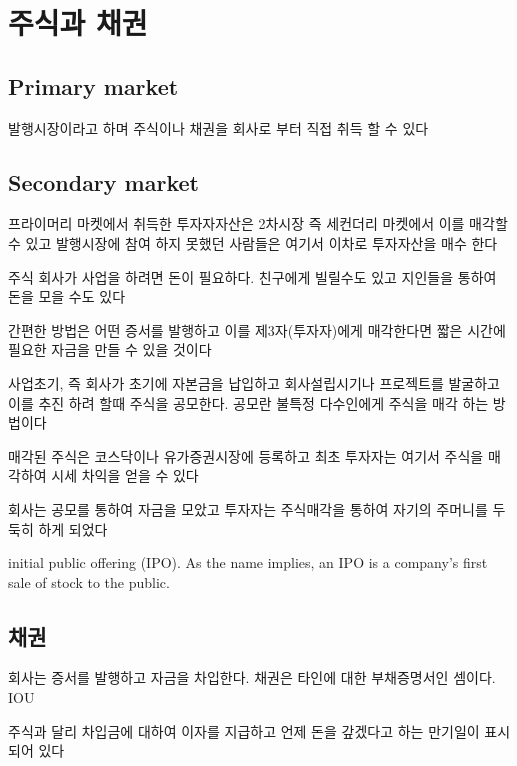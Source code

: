 \documentclass[
]{book}
\begin{document}
\hypertarget{uxc8fcuxc2dduxacfc-uxcc44uxad8c}{%
\chapter{주식과 채권}\label{uxc8fcuxc2dduxacfc-uxcc44uxad8c}}

\hypertarget{primary-market}{%
\section{Primary market}\label{primary-market}}

발행시장이라고 하며 주식이나 채권을 회사로 부터 직접 취득 할 수 있다

\hypertarget{secondary-market}{%
\section{Secondary market}\label{secondary-market}}

프라이머리 마켓에서 취득한 투자자자산은 2차시장 즉 세컨더리 마켓에서 이를 매각할 수 있고 발행시장에 참여 하지 못했던 사람들은 여기서 이차로 투자자산을 매수 한다

주식
회사가 사업을 하려면 돈이 필요하다. 친구에게 빌릴수도 있고 지인들을 통하여 돈을 모을 수도 있다

간편한 방법은 어떤 증서를 발행하고 이를 제3자(투자자)에게 매각한다면 짧은 시간에 필요한 자금을 만들 수 있을 것이다

사업초기, 즉 회사가 초기에 자본금을 납입하고 회사설립시기나 프로젝트를 발굴하고 이를 추진 하려 할때 주식을 공모한다. 공모란 불특정 다수인에게 주식을 매각 하는 방법이다

매각된 주식은 코스닥이나 유가증권시장에 등록하고 최초 투자자는 여기서 주식을 매각하여 시세 차익을 얻을 수 있다

회사는 공모를 통하여 자금을 모았고 투자자는 주식매각을 통하여 자기의 주머니를 두둑히 하게 되었다

initial public offering (IPO). As the name implies, an IPO is a company's first sale of stock to the public.

\hypertarget{uxcc44uxad8c}{%
\section{채권}\label{uxcc44uxad8c}}

회사는 증서를 발행하고 자금을 차입한다. 채권은 타인에 대한 부채증명서인 셈이다. IOU

주식과 달리 차입금에 대하여 이자를 지급하고 언제 돈을 갚겠다고 하는 만기일이 표시 되어 있다
\end{document}
